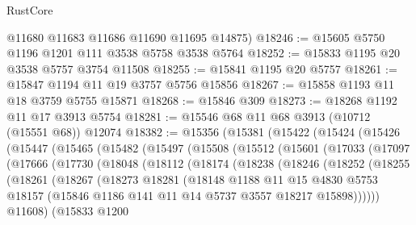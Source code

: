 \begin{lexlean}{RustCore}
\begin{coremodule}
      @11680
      @11683
      @11686
      @11690
      @11695
      @14875)
@18246 := @15605 @5750 @1196 @1201 @111 @3538 @5758 @3538 @5764
@18252 := @15833 @1195 @20 @3538 @5757 @3754 @11508
@18255 := @15841 @1195 @20 @5757
@18261 := @15847 @1194 @11 @19 @3757 @5756 @15856
@18267 := @15858 @1193 @11 @18 @3759 @5755 @15871
@18268 := @15846 @309
@18273 := @18268 @1192 @11 @17 @3913 @5754
@18281 := @15546 @68 @11 @68 @3913 (@10712 (@15551 @68)) @12074
@18382 := @15356
    (@15381
      (@15422
        (@15424
          (@15426
            (@15447
              (@15465
                (@15482
                  (@15497
                    (@15508
                      (@15512
                        (@15601
                          (@17033
                            (@17097
                              (@17666
                                (@17730
                                  (@18048
                                    (@18112
                                      (@18174
                                        (@18238
                                          (@18246
                                            (@18252
                                              (@18255
                                                (@18261
                                                  (@18267
                                                    (@18273
                                                      @18281
                                                      (@18148
                                                        @1188
                                                        @11
                                                        @15
                                                        @4830
                                                        @5753
                                                        @18157
                                                        (@15846
                                                          @1186
                                                          @141
                                                          @11
                                                          @14
                                                          @5737
                                                          @3557
                                                          @18217
                                                          @15898))))))
                                              @11608)
                                            (@15833
                                              @1200

\end{coremodule}
\end{lexlean}
